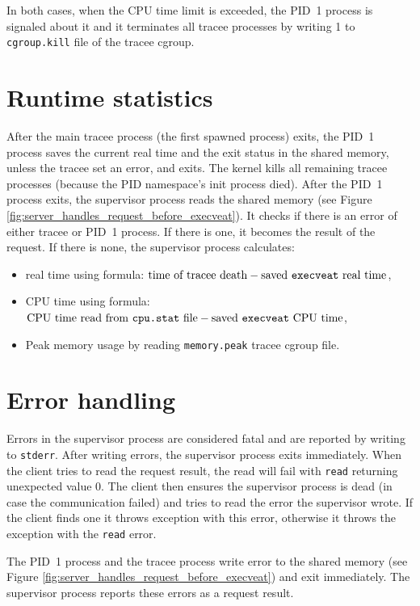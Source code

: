 \documentclass[en]{pracamgr}
\begin{document}
In both cases, when the CPU time limit is exceeded, the PID~1 process is signaled about it and it terminates all tracee processes by writing 1 to \texttt{cgroup.kill} file of the tracee cgroup.

\section{Runtime statistics}

After the main tracee process (the first spawned process) exits, the PID~1 process saves the current real time and the exit status in the shared memory, unless the tracee set an error, and exits. The kernel kills all remaining tracee processes (because the PID namespace's init process died). After the PID~1 process exits, the supervisor process reads the shared memory (see Figure \ref{fig:server_handles_request_before_execveat}). It checks if there is an error of either tracee or PID~1 process. If there is one, it becomes the result of the request. If there is none, the supervisor process calculates:
\begin{itemize}
    \item real time using formula: $\text{time of tracee death} - \text{saved \texttt{execveat} real time}$,
    \item CPU time using formula: $\text{CPU time read from \texttt{cpu.stat} file} - \text{saved \texttt{execveat} CPU time}$,
    \item Peak memory usage by reading \texttt{memory.peak} tracee cgroup file.
\end{itemize}

\section{Error handling}

Errors in the supervisor process are considered fatal and are reported by writing to \texttt{stderr}. After writing errors, the supervisor process exits immediately. When the client tries to read the request result, the read will fail with \texttt{read} returning unexpected value 0. The client then ensures the supervisor process is dead (in case the communication failed) and tries to read the error the supervisor wrote. If the client finds one it throws exception with this error, otherwise it throws the exception with the \texttt{read} error.

The PID~1 process and the tracee process write error to the shared memory (see Figure \ref{fig:server_handles_request_before_execveat}) and exit immediately. The supervisor process reports these errors as a request result.
\end{document}
